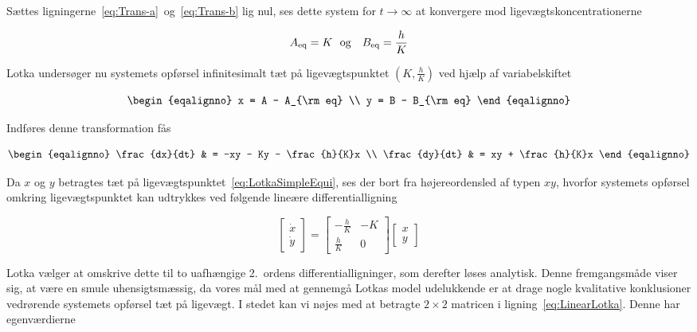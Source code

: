 S{\ae}ttes ligningerne~\ref{eq:Trans-a}~og~\ref{eq:Trans-b}
lig nul, ses dette system for $t \rightarrow \infty$ at
konvergere mod ligev{\ae}gts\-koncentrationerne

\begin{equation}
  A_{\rm eq} = K \mbox{\ \ og \ \ }  B_{\rm eq} = \frac{h}{K}
  \label{eq:LotkaSimpleEqui}
\end{equation}

Lotka unders{\o}ger nu systemets opf{\o}rsel infinitesimalt
t{\ae}t p{\aa} ligev{\ae}gts\-\-punktet $(K,\frac{h}{K})$
ved hj{\ae}lp af variabelskiftet

\begin{subequations}
  \begin{eqalignno}
   x = A - A_{\rm eq} \\
   y = B - B_{\rm eq}
  \end{eqalignno}
\end{subequations}

Indf{\o}res denne transformation f{\aa}s

\begin{subequations}
  \begin{eqalignno}
    \frac{dx}{dt} & = -xy - Ky - \frac{h}{K}x \\
    \frac{dy}{dt} & =  xy +      \frac{h}{K}x 
  \end{eqalignno}
\end{subequations}

Da $x$ og $y$ betragtes t{\ae}t p{\aa}
ligev{\ae}gts\-punktet~\ref{eq:LotkaSimpleEqui}, ses der
bort fra h{\o}jere\-ordens\-led af typen $xy$, hvorfor
systemets opf{\o}rsel omkring ligev{\ae}gts\-punktet kan
udtrykkes ved f{\o}lgende line{\ae}re differentiallig\-ning

\begin{equation}
  \left[ \begin{array}{c} \dot{x} \\ \dot{y} \end{array} \right] =
  \left[ \begin{array}{rc}
          -\frac{h}{K} & -K \\
           \frac{h}{K} &  0
  \end{array} \right]
  \left[ \begin{array}{c} x \\ y \end{array} \right]
  \label{eq:LinearLotka}
\end{equation}

Lotka v{\ae}lger at omskrive dette til to uafh{\ae}ngige
2.\ ordens differentiallig\-ninger, som derefter l{\o}ses
analytisk. Denne fremgangsm{\aa}de viser sig, at v{\ae}re
en smule uhensigts\-m{\ae}ssig, da vores m{\aa}l med at
gennemg{\aa} Lotkas model udelukkende er at drage nogle
kvalitative konklusioner vedr{\o}rende systemets
opf{\o}rsel t{\ae}t p{\aa} ligev{\ae}gt. I stedet kan vi
n{\o}jes med at betragte $2 \times 2$ matricen i
lig\-ning~\ref{eq:LinearLotka}. Denne har egenv{\ae}rdierne

